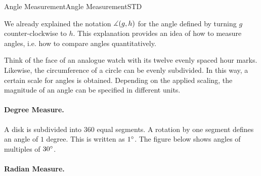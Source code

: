 \begin{MXContent}{Angle Measurement}{Angle Measurement}{STD}

We already explained the notation $\measuredangle(g,h)$ for the angle defined by turning 
$g$ counter-clockwise to $h$. This explanation provides an idea of how to measure angles, i.e.
how to compare angles quantitatively.

Think of the face of an analogue watch with its twelve evenly spaced hour marks. Likewise, 
the circumference of a circle can be evenly subdivided. In this way, a certain scale for 
angles is obtained. Depending on the applied scaling, the magnitude of an angle can be specified in 
different units. 

\paragraph{Degree Measure.}

A disk is subdivided into $360$ equal segments. A rotation by one segment defines an
angle of $1$ degree. This is written as $1^{\circ}$. The figure below shows angles 
of multiples of $30^{\circ}$.

\begin{center}
\end{center}

\paragraph{Radian Measure.}


\end{MXContent}
